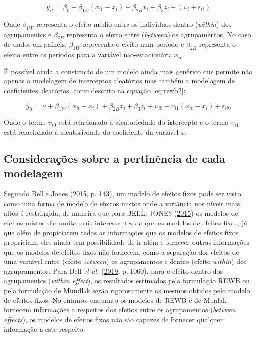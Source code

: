 \documentclass[
  a4paper, 11pt]{article}
\begin{document}
\begin{equation} \label{eq:rewb}
y_{it} = \beta_0 + \beta_{1W} (x_{it} - \bar{x}_i) + \beta_{2B}\bar{x}_i+ \beta_3 z_i + (\upsilon_i + \epsilon_{it}) 
\end{equation}

Onde \(\beta_{1W}\) representa o efeito médio entre os indivíduos dentro
(\emph{within}) dos agrupamentos e \(\beta_{2B}\) representa o efeito
entre (\emph{between}) os agrupamentos. No caso de dados em paínéis,
\(\beta_{1W}\) representa o efeito num período e \(\beta_{2B}\)
representa o efeito entre os períodos para a variável não-estacionária
\(x_{it}\).

É possível ainda a construção de um modelo ainda mais genérico que
permite não apenas a modelagem de interceptos aleatórios mas também a
modelagem de coeficientes aleatórios, como descrito na equação
\ref{eq:rewb2}:

\begin{equation} \label{eq:rewb2}
y_{it} = \mu + \beta_{1W} (x_{it} - \bar{x}_i) + \beta_{2B}\bar{x}_i+ 
\beta_3 z_i + \upsilon_{i0} + \upsilon_{i1} (x_{it} - \bar{x}_i) + \epsilon_{it0} 
\end{equation}

Onde o termo \(\upsilon_{i0}\) está relacionado à aleatoriedade do
intercepto e o termo \(\upsilon_{i1}\) está relacionado à aleatoriedade
do coeficiente da variável \(x\).

\hypertarget{considerauxe7uxf5es-sobre-a-pertinuxeancia-de-cada-modelagem}{%
\subsection{Considerações sobre a pertinência de cada
modelagem}\label{considerauxe7uxf5es-sobre-a-pertinuxeancia-de-cada-modelagem}}

Segundo Bell e Jones (\protect\hyperlink{ref-bell2015}{2015}, p. 143),
um modelo de efeitos fixos pode ser visto como uma forma de modelo de
efeitos mistos onde a variância nos níveis mais altos é restringida, de
maneira que para BELL; JONES (\protect\hyperlink{ref-bell2015}{2015}) os
modelos de efeitos mistos são muito mais interessantes do que os modelos
de efeitos fixos, já que além de propiciarem todas as informações que os
modelos de efeitos fixos propriciam, eles ainda tem possibilidade de ir
além e fornecer outras informações que os modelos de efeitos fixos não
fornecem, como a separação dos efeitos de uma variável entre (efeito
\emph{between}) os agrupamentos e dentro (efeito \emph{within}) dos
agrupramentos. Para Bell \emph{et al.}
(\protect\hyperlink{ref-bell2019}{2019}, p. 1060), para o efeito dentro
dos agrupamentos (\emph{within effect}), os resultados estimados pela
formulação REWB ou pela formulação de Mundlak serão rigorosamente os
mesmos obtidos pelo modelo de efeitos fixos. No entanto, enquanto os
modelos de REWB e de Munlak fornecem informações a respeitos dos efeitos
entre os agrupamentos (\emph{between effects}), os modelos de efeitos
fixos não são capazes de fornecer qualquer informação a este respeito.
\end{document}
